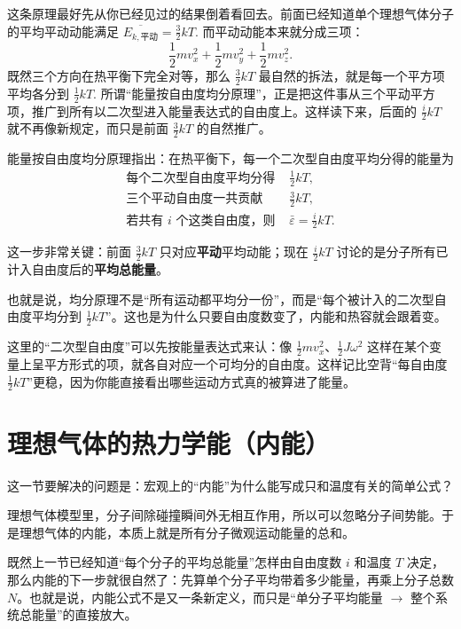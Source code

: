 \documentclass[lang=cn,11pt]{elegantbook}
\newcommand{\bridge}[1]{\begin{note}#1\end{note}}
\begin{document}
这条原理最好先从你已经见过的结果倒着看回去。前面已经知道单个理想气体分子的平均平动动能满足
 \(\overline{E_{k,\text{平动}}}=\frac32 kT.\) 
而平动动能本来就分成三项：
\[
\frac12 mv_x^2+\frac12 mv_y^2+\frac12 mv_z^2.
\]
既然三个方向在热平衡下完全对等，那么 \(\frac32 kT\) 最自然的拆法，就是每一个平方项平均各分到
 \(\frac12 kT.\) 
所谓“能量按自由度均分原理”，正是把这件事从三个平动平方项，推广到所有以二次型进入能量表达式的自由度上。这样读下来，后面的 \(\frac{i}{2}kT\) 就不再像新规定，而只是前面 \(\frac32 kT\) 的自然推广。

能量按自由度均分原理指出：在热平衡下，每一个二次型自由度平均分得的能量为
\[
\begin{aligned}
\text{每个二次型自由度平均分得 }&\frac{1}{2}kT,\\
\text{三个平动自由度一共贡献 }&\frac{3}{2}kT,\\
\text{若共有 \(i\) 个这类自由度，则 }&\bar\varepsilon=\frac{i}{2}kT.
\end{aligned}
\]

\bridge{这一步非常关键：前面 \(\frac32 kT\) 只对应\textbf{平动}平均动能；现在 \(\frac{i}{2}kT\) 讨论的是分子所有已计入自由度后的\textbf{平均总能量}。}

\bridge{也就是说，均分原理不是“所有运动都平均分一份”，而是“每个被计入的二次型自由度平均分到 \(\frac12 kT\)”。这也是为什么只要自由度数变了，内能和热容就会跟着变。}

\begin{note}
这里的“二次型自由度”可以先按能量表达式来认：像 \(\frac12 mv_x^2\)、\(\frac12 J\omega^2\) 这样在某个变量上呈平方形式的项，就各自对应一个可均分的自由度。这样记比空背“每自由度 \(\frac12 kT\)”更稳，因为你能直接看出哪些运动方式真的被算进了能量。
\end{note}

\section{理想气体的热力学能（内能）}

这一节要解决的问题是：宏观上的“内能”为什么能写成只和温度有关的简单公式？

理想气体模型里，分子间除碰撞瞬间外无相互作用，所以可以忽略分子间势能。于是理想气体的内能，本质上就是所有分子微观运动能量的总和。

既然上一节已经知道“每个分子的平均总能量”怎样由自由度数 \(i\) 和温度 \(T\) 决定，那么内能的下一步就很自然了：先算单个分子平均带着多少能量，再乘上分子总数 \(N\)。也就是说，内能公式不是又一条新定义，而只是“单分子平均能量 \(\rightarrow\) 整个系统总能量”的直接放大。
\end{document}
